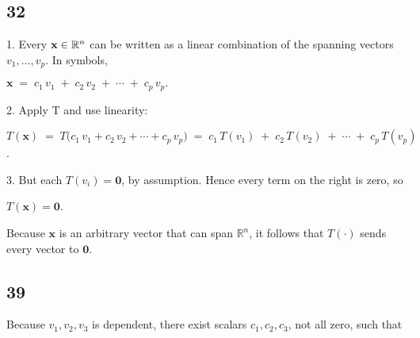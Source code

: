 \documentclass{article}
\begin{document}
\subsection*{32}
1.	Every $\mathbf{x}\in \Bbb R^n$ can be written as a linear combination of the spanning vectors $v_1,\dots,v_p$.  In symbols,

$\mathbf{x} \;=\; c_1\,v_1 \;+\; c_2\,v_2 \;+\;\cdots\;+\;c_p\,v_p.$

	2.	Apply T and use linearity:

$T(\mathbf{x})
\;=\;
T\bigl(c_1\,v_1 + c_2\,v_2 + \cdots + c_p\,v_p\bigr)
\;=\;
c_1\,T(v_1) \;+\; c_2\,T(v_2) \;+\;\cdots\;+\;c_p\,T(v_p)$.

	3.	But each $T(v_i)=\mathbf{0}$, by assumption.  Hence every term on the right is zero, so

$T(\mathbf{x}) = \mathbf{0}$.


Because $\mathbf{x}$ is an arbitrary vector that can span $\mathbb{R}^n$, it follows that $T(\cdot)$ sends every vector to $\mathbf{0}$.
\subsection*{39}
Because $v_1,v_2,v_3$ is dependent, there exist scalars $c_1,c_2,c_3$, not all zero, such that
\end{document}
